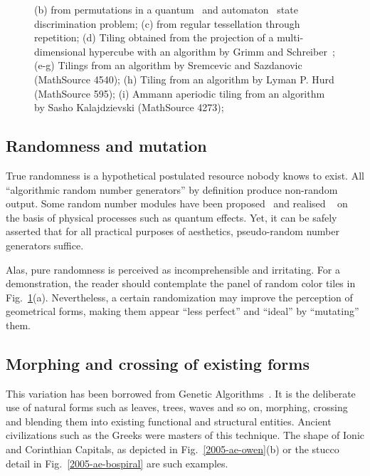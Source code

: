 \documentclass[rmp,amssymb,showpacs,showkeys,12pt,preprint]{revtex4}
\begin{document}
\begin{figure}
{(b) from permutations in a quantum~\cite{DonSvo01}
and automaton~\cite{svozil-2004-kyoto,svozil-2003-garda} state discrimination problem;
(c) from regular tessellation through repetition;
(d) Tiling obtained from the projection of a multi-dimensional hypercube with
an algorithm by  Grimm and Schreiber~\cite{grimm-schr-02};
(e-g) Tilings from
an algorithm by  Sremcevic and Sazdanovic (MathSource 4540);
(h) Tiling from
an algorithm by Lyman P. Hurd (MathSource 595);
(i) Ammann aperiodic tiling from
an algorithm by Sasho Kalajdzievski (MathSource 4273);
}
   \label{2005-ae-raster-wn}
 \end{figure}


\subsection{Randomness and mutation}

True randomness is a hypothetical postulated resource nobody knows to exist.
All ``algorithmic random number generators'' by definition produce
non-random output. Some random number modules have been proposed~\cite{svozil-qct}
and realised ~\cite{zeilinger:qct}
on the basis of physical processes such as quantum effects.
Yet, it can be safely asserted that for all practical purposes of
aesthetics, pseudo-random number generators suffice.

Alas, pure randomness is perceived as incomprehensible and irritating. For a
demonstration, the reader should contemplate the panel of random color
tiles in Fig.~\ref{2005-ae-raster-wn}(a).
Nevertheless, a certain randomization may improve the
perception of geometrical forms, making them appear ``less perfect'' and
``ideal'' by ``mutating'' them.


\subsection{Morphing and crossing of existing forms}

This variation has been borrowed from Genetic Algorithms~\cite{goldberg:89,holland:92a,mitchell}.
It is
the deliberate use of natural forms such as leaves, trees, waves and so on,
morphing, crossing and blending them into existing functional and structural
entities.
Ancient civilizations such as the Greeks were masters of this technique.
The shape of Ionic and Corinthian Capitals,
as depicted in Fig.~\ref{2005-ae-owen}(b)
or the stucco detail in  Fig.~\ref{2005-ae-bospiral}
are such examples.
\end{document}

